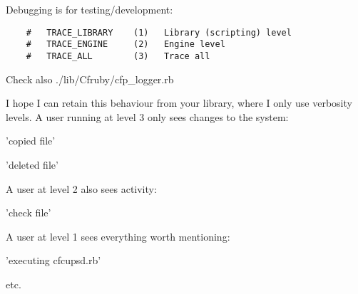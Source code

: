 Debugging is for testing/development:                                          
                
\begin{verbatim}
    #   TRACE_LIBRARY    (1)   Library (scripting) level                      
    #   TRACE_ENGINE     (2)   Engine level                                   
    #   TRACE_ALL        (3)   Trace all                                      
\end{verbatim}
                                                              
                                                                              
Check also ./lib/Cfruby/cfp\_logger.rb                                         
                                                                              
I hope I can retain this behaviour from your library, where I only use        
verbosity levels. A user running at level 3 only sees changes to the          
system:                                                                       
                                                                              
'copied file'                                                                 

'deleted file'                                                                
                                                                              
A user at level 2 also sees activity:                                         
                                                                              
'check file'                                                                  
                                                                              
A user at level 1 sees everything worth mentioning:         
                                                                              
'executing cfcupsd.rb'                                                        
                                                                              
etc.                                                                          
               
                                                                              

